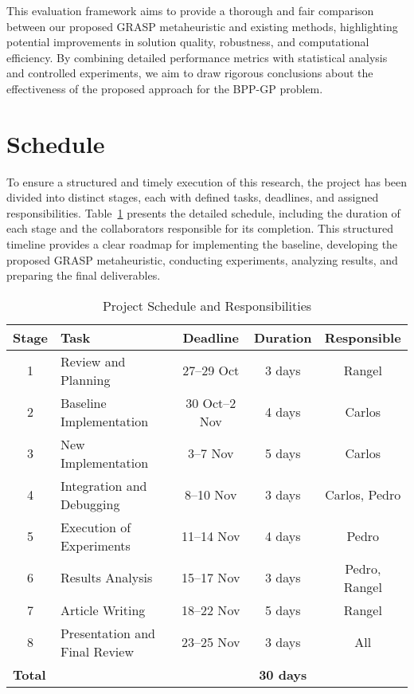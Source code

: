\documentclass[12pt]{article}
\begin{document}
This evaluation framework aims to provide a thorough and fair comparison between our proposed GRASP metaheuristic and existing methods, 
highlighting potential improvements in solution quality, robustness, and computational efficiency. By combining detailed performance metrics 
with statistical analysis and controlled experiments, we aim to draw rigorous conclusions about the effectiveness of the proposed approach for 
the BPP-GP problem.


\newpage
\section{Schedule}

To ensure a structured and timely execution of this research, the project has been divided into distinct stages, each with defined tasks, 
deadlines, and assigned responsibilities. Table~\ref{tab:schedule} presents the detailed schedule, including the duration of each stage 
and the collaborators responsible for its completion. This structured timeline provides a clear roadmap for implementing the baseline, 
developing the proposed GRASP metaheuristic, conducting experiments, analyzing results, and preparing the final deliverables.


\begin{table}[ht]
\caption{Project Schedule and Responsibilities}
\label{tab:schedule}
\begin{tabular}{clccc}
\hline
\textbf{Stage} & \textbf{Task} & \textbf{Deadline} & \textbf{Duration} & \textbf{Responsible} \\ \hline
1 & Review and Planning & 27--29 Oct & 3 days & Rangel \\
2 & Baseline Implementation & 30 Oct--2 Nov & 4 days & Carlos \\
3 & New Implementation & 3--7 Nov & 5 days & Carlos \\
4 & Integration and Debugging & 8--10 Nov & 3 days & Carlos, Pedro \\
5 & Execution of Experiments & 11--14 Nov & 4 days & Pedro \\
6 & Results Analysis & 15--17 Nov & 3 days & Pedro, Rangel \\
7 & Article Writing & 18--22 Nov & 5 days & Rangel \\
8 & Presentation and Final Review & 23--25 Nov & 3 days & All \\ \hline
\multicolumn{2}{l}{\textbf{Total}} & & \textbf{30 days} & \\ \hline
\end{tabular}
\end{table}
\end{document}
